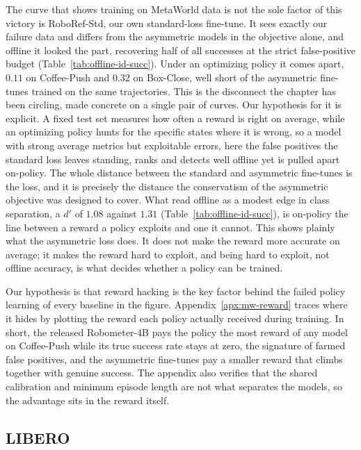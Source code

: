 The curve that shows training on MetaWorld data is not the sole factor of this victory is RoboRef-Std, our own standard-loss fine-tune. It sees exactly our failure data and differs from the asymmetric models in the objective alone, and offline it looked the part, recovering half of all successes at the strict false-positive budget (Table~\ref{tab:offline-id-succ}). Under an optimizing policy it comes apart, $0.11$ on Coffee-Push and $0.32$ on Box-Close, well short of the asymmetric fine-tunes trained on the same trajectories. This is the disconnect the chapter has been circling, made concrete on a single pair of curves. Our hypothesis for it is explicit. A fixed test set measures how often a reward is right on average, while an optimizing policy hunts for the specific states where it is wrong, so a model with strong average metrics but exploitable errors, here the false positives the standard loss leaves standing, ranks and detects well offline yet is pulled apart on-policy. The whole distance between the standard and asymmetric fine-tunes is the loss, and it is precisely the distance the conservatism of the asymmetric objective was designed to cover. What read offline as a modest edge in class separation, a $d'$ of $1.08$ against $1.31$ (Table~\ref{tab:offline-id-succ}), is on-policy the line between a reward a policy exploits and one it cannot. This shows plainly what the asymmetric loss does. It does not make the reward more accurate on average; it makes the reward hard to exploit, and being hard to exploit, not offline accuracy, is what decides whether a policy can be trained.

Our hypothesis is that reward hacking is the key factor behind the failed policy learning of every baseline in the figure. Appendix~\ref{apx:mw-reward} traces where it hides by plotting the reward each policy actually received during training. In short, the released Robometer-4B pays the policy the most reward of any model on Coffee-Push while its true success rate stays at zero, the signature of farmed false positives, and the asymmetric fine-tunes pay a smaller reward that climbs together with genuine success. The appendix also verifies that the shared calibration and minimum episode length are not what separates the models, so the advantage sits in the reward itself.

\subsection{LIBERO}
\label{sec:results-rl-libero}

